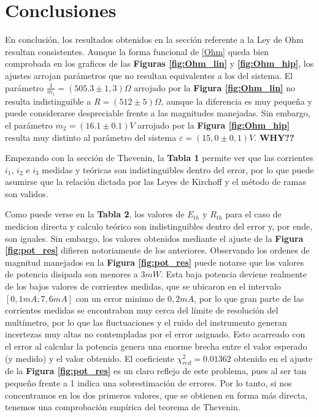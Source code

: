 \documentclass[11pt,a4paper]{article}
\begin{document}

\section{Conclusiones}
\label{sec:conclusiones}

En conclusión, los resultados obtenidos en la sección referente a la Ley de Ohm resultan consistentes. Aunque la forma funcional de \eqref{Ohm} queda bien comprobada en los graficos de las \textbf{Figuras \ref{fig:Ohm_lin}} y \textbf{\ref{fig:Ohm_hip}}, los ajustes arrojan parámetros que no resultan equivalentes a los del sistema. El parámetro $\frac{1}{m_1} = (505.3 \pm 1,3)\Omega$ arrojado por la \textbf{Figura \ref{fig:Ohm_lin}} no resulta indistinguible a $R = (512 \pm 5)\Omega$, aunque la diferencia es muy pequeña y puede considerarse despreciable frente a las magnitudes manejadas. Sin embargo, el parámetro $m_2 = (16.1\pm0.1)V$ arrojado por la \textbf{Figura \ref{fig:Ohm_hip}} resulta muy distinto al parámetro del sistema $\varepsilon = (15,0 \pm 0,1)V$. \textbf{WHY??}

Empezando con la sección de Thevenin, la \textbf{Tabla 1} permite ver que las corrientes $i_1$, $i_2$ e $i_3$ medidas y teóricas son indistinguibles dentro del error, por lo que puede asumirse que la relación dictada por las Leyes de Kirchoff y el método de ramas son validos. 

Como puede verse en la \textbf{Tabla 2}, los valores de $E_{th}$ y $R_{th}$ para el caso de medicion directa y calculo teórico son indistinguibles dentro del error y, por ende, son iguales. Sin embargo, los valores obtenidos mediante el ajuste de la \textbf{Figura \ref{fig:pot_res}} difieren notoriamente de los anteriores. Observando los ordenes de magnitud manejados en la \textbf{Figura \ref{fig:pot_res}} puede notarse que los valores de potencia disipada son menores a $3mW$. Esta baja potencia deviene realmente de los bajos valores de corrientes medidas, que se ubicaron en el intervalo $[0,1mA;7,6mA]$ con un error minimo de $0,2mA$, por lo que gran parte de las corrientes medidas se encontraban muy cerca del límite de resolución del multímetro, por lo que las fluctuaciones y el ruido del instrumento generan incertezas muy altas no contempladas por el error asignado. Esto acarreado con el error al calcular la potencia genera una enorme brecha entre el valor esperado (y medido) y el valor obtenido. El coeficiente $\chi_{red}^{2} = 0.01362$ obtenido en el ajuste de la \textbf{Figura \ref{fig:pot_res}} es un claro reflejo de este problema, pues al ser tan pequeño frente a 1 indica una sobrestimación de errores. Por lo tanto, si nos concentramos en los dos primeros valores, que se obtienen en forma más directa, tenemos una comprobación empírica del teorema de Thevenin. 
\end{document}
